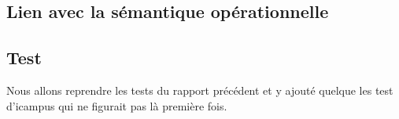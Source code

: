 \subsection{Lien avec la sémantique opérationnelle}


\subsection{Test}
Nous allons reprendre les tests du rapport précédent et y ajouté quelque les test d'icampus qui ne figurait pas là première fois.




